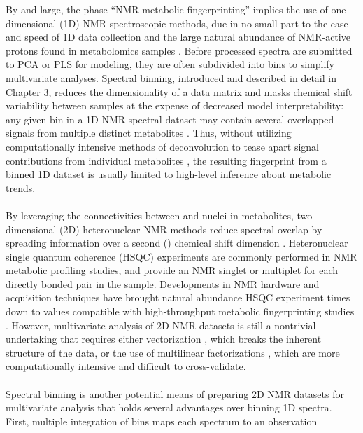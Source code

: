 \begin{doublespace}
By and large, the phase ``NMR metabolic fingerprinting'' implies the use of
one-dimensional (1D) \hnmr{} NMR spectroscopic methods, due in no small part
to the ease and speed of 1D data collection and the large natural abundance
of NMR-active protons found in metabolomics samples
\cite{lindon:cmr2000,worley:cmb2013}. Before processed spectra are
submitted to PCA or PLS for modeling, they are often subdivided into bins
to simplify multivariate analyses. Spectral binning, introduced and described
in detail in \hyperlink{chapter.3}{Chapter 3}, reduces the dimensionality of
a data matrix and masks chemical shift variability between samples at the
expense of decreased model interpretability: any given bin in a 1D \hnmr{} NMR
spectral dataset may contain several overlapped signals from multiple distinct
metabolites \cite{aberg:abc2009}. Thus, without utilizing
computationally intensive methods of deconvolution to tease apart signal
contributions from individual metabolites
\cite{astle:jasa2012,zheng:binf2011}, the resulting fingerprint from a
binned 1D dataset is usually limited to high-level inference about metabolic
trends.
\\\\
By leveraging the connectivities between \hnmr{} and \cnmr{} nuclei in
metabolites, two-dimensional (2D) heteronuclear NMR methods reduce spectral
overlap by spreading \hnmr{} information over a second (\cnmr) chemical shift
dimension \cite{mandal:cmr2004}. Heteronuclear single quantum coherence (HSQC)
experiments are commonly performed in NMR metabolic profiling studies, and
provide an NMR singlet or multiplet for each directly bonded \hcnmr{} pair
in the sample. Developments in NMR hardware and acquisition techniques have
brought natural abundance \hcnmr{} HSQC experiment times down to values
compatible with high-throughput metabolic fingerprinting studies
\cite{motta:anchem2010,rai:anchem2012}. However, multivariate analysis
of 2D NMR datasets is still a nontrivial undertaking that requires either
vectorization \cite{hedenstrom:cils2008}, which breaks the inherent
structure of the data, or the use of multilinear factorizations
\cite{lu:ieee2009,lu:pr2011}, which are more computationally intensive
and difficult to cross-validate.
\\\\
Spectral binning is another potential means of preparing 2D NMR datasets for
multivariate analysis that holds several advantages over binning 1D spectra.
First, multiple integration of bins maps each spectrum to an observation

\end{doublespace}
